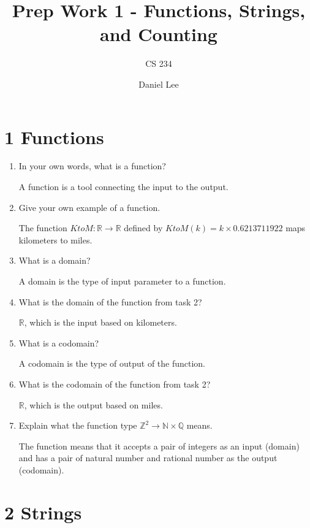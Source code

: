 \documentclass[10pt]{article}
\title{Prep Work 1 - Functions, Strings, and Counting }
\author{CS 234}
\date{Daniel Lee}
\begin{document}
\maketitle

\section*{1 \quad Functions}

\begin{enumerate}
  \item In your own words, what is a function?

        A function is a tool connecting the input to the output.
  \item Give your own example of a function.

        The function $KtoM : \mathbb{R} \to \mathbb{R}$ defined by $KtoM(k) = k \times 0.6213711922$ maps kilometers to miles.
  \item What is a domain?

        A domain is the type of input parameter to a function.
  \item What is the domain of the function from task 2?

        $\mathbb{R}$, which is the input based on kilometers.
  \item What is a codomain?

        A codomain is the type of output of the function.
  \item What is the codomain of the function from task 2?

        $\mathbb{R}$, which is the output based on miles.
  \item Explain what the function type $\mathbb{Z}^{2} \rightarrow \mathbb{N} \times \mathbb{Q}$ means.

        The function means that it accepts a pair of integers as an input (domain) and has a pair of natural number and rational number as the output (codomain).
\end{enumerate}

\section*{2 \quad Strings}
\end{document}
